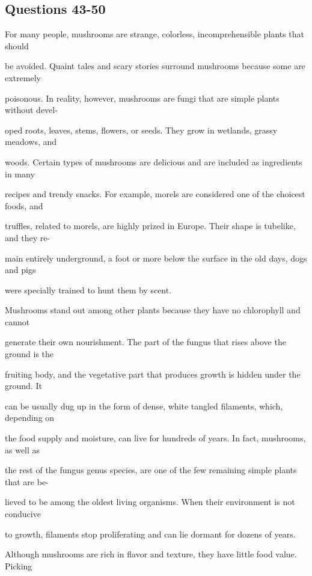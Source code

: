 \documentclass[12pt]{article}
\begin{document}
\subsection*{Questions 43-50}
\begingroup
\small
\sloppy
\setlength{\parskip}{0pt}
\setlength{\parindent}{0pt}
For many people, mushrooms are strange, colorless, incomprehensible plants that should\par
be avoided. Quaint tales and scary stories surround mushrooms because some are extremely\par
poisonous. In reality, however, mushrooms are fungi that are simple plants without devel-\par
oped roots, leaves, stems, flowers, or seeds. They grow in wetlands, grassy meadows, and\par
woods. Certain types of mushrooms are delicious and are included as ingredients in many\par
recipes and trendy snacks. For example, morels are considered one of the choicest foods, and\par
truffles, related to morels, are highly prized in Europe. Their shape is tubelike, and they re-\par
main entirely underground, a foot or more below the surface in the old days, dogs and pigs\par
were specially trained to hunt them by scent.\par
Mushrooms stand out among other plants because they have no chlorophyll and cannot\par
generate their own nourishment. The part of the fungus that rises above the ground is the\par
fruiting body, and the vegetative part that produces growth is hidden under the ground. It\par
can be usually dug up in the form of dense, white tangled filaments, which, depending on\par
the food supply and moisture, can live for hundreds of years. In fact, mushrooms, as well as\par
the rest of the fungus genus species, are one of the few remaining simple plants that are be-\par
lieved to be among the oldest living organisms. When their environment is not conducive\par
to growth, filaments stop proliferating and can lie dormant for dozens of years.\par
Although mushrooms are rich in flavor and texture, they have little food value. Picking\par
\end{document}
